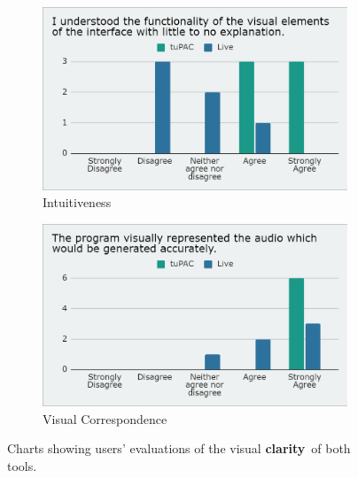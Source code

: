 \documentclass[12pt,a4paper,oneside,openright]{report}
\newcommand{\clarity}{\textbf{clarity}}
\begin{document}
\begin{figure}[h!]
\centering
\begin{subfigure}{.5\textwidth}
  \centering
  \includegraphics[width=.9\linewidth]{images/questionnaire/intuitiveness.png}
  \caption{Intuitiveness}
  \label{fig:q_intu}
\end{subfigure}%
\begin{subfigure}{.5\textwidth}
  \centering
  \includegraphics[width=.9\linewidth]{images/questionnaire/visual_correspondence.png}
  \caption{Visual Correspondence}
  \label{fig:q_corresp}
\end{subfigure}
\caption{Charts showing users' evaluations of the visual \clarity\ of both tools.}
\label{fig:q_2}
\end{figure}
\end{document}
